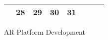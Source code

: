 {\begin{tabularx}{\linewidth}{|l!{\vrule width \myLenLineThicknessThick}*{7}{@{}X@{}|}}
       & 
    
      
      
        \begin{minipage}[t]{6mm}\centering{}28\end{minipage}
      
       & 
    
      
      
        \begin{minipage}[t]{6mm}\centering{}29\end{minipage}
      
       & 
    
      
      
        \begin{minipage}[t]{6mm}\centering{}30\end{minipage}
      
       & 
    
      
      
        \begin{minipage}[t]{6mm}\centering{}31\end{minipage}
      
       & 
    
      
      
       & 
    
      
      
      
        \\  \hline 
      
    
  
  
  \end{tabularx}
}
\vfill{\centering{} \small{AR Platform Development}\hspace{1.5em}\par}

\pagebreak
